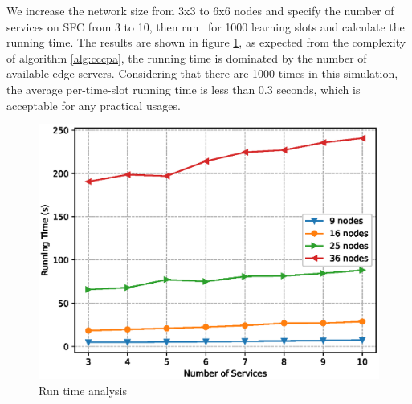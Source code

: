We increase the network size from 3x3 to 6x6 nodes and specify the number of services on SFC from 3 to 10, then run \myalgorithm\ for 1000 learning slots and calculate the running time. The results are shown in figure \ref{fig:runtimeanalysis}, as expected from the complexity of algorithm \ref{alg:cccpa}, the running time is dominated by the number of available edge servers. Considering that there are 1000 times in this simulation, the average per-time-slot running time is less than 0.3 seconds, which is acceptable for any practical usages.
\begin{figure}
	\centering
	\includegraphics[width=.9\textwidth]{figs/replotruntime_smallfont.eps}
	\vspace{\baselineskip}
	\caption{Run time analysis}
	\label{fig:runtimeanalysis}
\end{figure}







